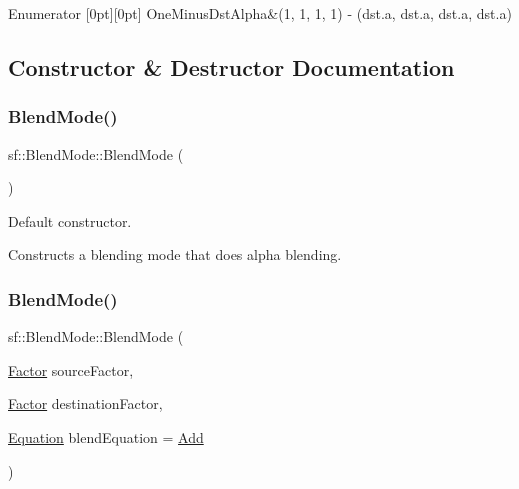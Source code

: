 \begin{DoxyEnumFields}{Enumerator}
[0pt][0pt]{}\mbox{\label{structsf_1_1_blend_mode_afb9852caf356b53bb0de460c58a9ebbbab4e5c63f189f26075e5939ad1a2ce4e4}} 
One\+Minus\+Dst\+Alpha&(1, 1, 1, 1) -\/ (dst.\+a, dst.\+a, dst.\+a, dst.\+a) \\
\hline

\end{DoxyEnumFields}


\subsection{Constructor \& Destructor Documentation}
\mbox{\label{structsf_1_1_blend_mode_a7faef75eae1fb47bbe93f45f38e3d345}} 
\subsubsection{\texorpdfstring{Blend\+Mode()}{BlendMode()}\hspace{0.1cm}{\footnotesize\ttfamily [1/3]}}
{\footnotesize\ttfamily sf\+::\+Blend\+Mode\+::\+Blend\+Mode (\begin{DoxyParamCaption}{ }\end{DoxyParamCaption})}



Default constructor. 

Constructs a blending mode that does alpha blending. \mbox{\label{structsf_1_1_blend_mode_a23c7452cc8e9eb943c3aea6234ce4297}} 
\subsubsection{\texorpdfstring{Blend\+Mode()}{BlendMode()}\hspace{0.1cm}{\footnotesize\ttfamily [2/3]}}
{\footnotesize\ttfamily sf\+::\+Blend\+Mode\+::\+Blend\+Mode (\begin{DoxyParamCaption}\item[{\hyperlink{structsf_1_1_blend_mode_afb9852caf356b53bb0de460c58a9ebbb}{Factor}}]{source\+Factor,  }\item[{\hyperlink{structsf_1_1_blend_mode_afb9852caf356b53bb0de460c58a9ebbb}{Factor}}]{destination\+Factor,  }\item[{\hyperlink{structsf_1_1_blend_mode_a7bce470e2e384c4f9c8d9595faef7c32}{Equation}}]{blend\+Equation = {\ttfamily \hyperlink{structsf_1_1_blend_mode_a7bce470e2e384c4f9c8d9595faef7c32a50c081d8f36cf7b77632966e15d38966}{Add}} }\end{DoxyParamCaption})}



